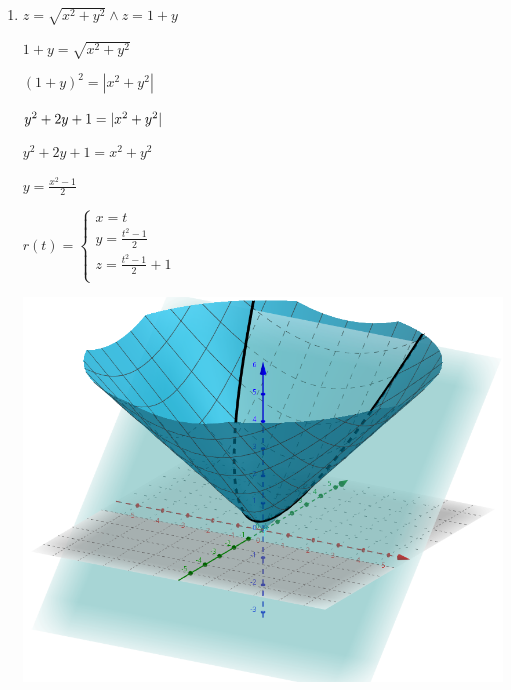 \documentclass[../practica_02.tex]{subfiles}
\begin{document}
\begin{enumerate}
        \item $ z = \sqrt{x^2+y^2} \wedge z = 1 + y$

            $ 1 + y = \sqrt{x^2 + y^2} $

            $ (1 + y)^2 = |x^2 + y^2| $

            $ y^2 + 2y + 1 = \abs*{x^2 + y^2} $

            $ y^2 + 2y + 1 = x^2 + y^2 $

            $ y = \frac{x^2 - 1}{2} $

            \quad $ r(t) = \left\{
                \begin{array}{ll}
                    x = t \\
                    y = \frac{t^2 - 1}{2} \\
                    z = \frac{t^2 - 1}{2} + 1 \\
                \end{array}
                \right.$

            \includegraphics[scale=0.4]{ej12/resources/c.png} $ $

    \end{enumerate}
\end{document}
